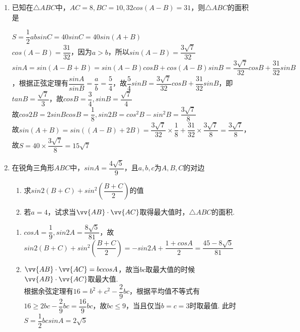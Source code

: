 \begin{enumerate}
    \item 已知在$\triangle{ABC}$中，$AC = 8, BC = 10, 32cos(A-B) = 31$，则$\triangle{ABC}$的面积是
    \begin{jieda}
        $S = \dfrac{1}{2}absinC = 40sinC = 40sin(A+B)$ \\
        $cos(A-B) = \dfrac{31}{32}$，因为$a > b$，所以$sin(A-B) = \dfrac{3\sqrt{7}}{32}$\\
        $sinA = sin(A-B+B) = sin(A-B) cosB + cos(A-B)sinB = \dfrac{3\sqrt{7}}{32}cosB+\dfrac{31}{32}sinB$，根据正弦定理有$\dfrac{sinA}{sinB} = \dfrac{a}{b} = \dfrac{5}{4}$，故$\dfrac{5}{4}sinB = \dfrac{3\sqrt{7}}{32}cosB+\dfrac{31}{32}sinB$，即$tanB = \dfrac{\sqrt{7}}{3}$，故$cosB = \dfrac{3}{4}, sinB = \dfrac{\sqrt{7}}{4}$ \\
        故$cos2B = 2sinBcosB = \dfrac{1}{8}, sin2B = cos^2B - sin^2B = \dfrac{3\sqrt{7}}{8}$ \\
        故$sin(A+B) = sin((A-B)+2B) = \dfrac{3\sqrt{7}}{32} \times \dfrac{1}{8} + \dfrac{31}{32} \times \dfrac{3\sqrt{7}}{8} = \dfrac{3\sqrt{7}}{8}$，故$S = 40 \times \dfrac{3\sqrt{7}}{8} = 15\sqrt{7}$
    \end{jieda}
    \item 在锐角三角形$ABC$中，$sinA = \dfrac{4\sqrt{5}}{9}$，且$a,b,c$为$A,B,C$的对边
    \begin{enumerate}
        \item 求$sin2(B+C) + sin^2\left(\dfrac{B+C}{2}\right)$的值
        \item 若$a = 4$，试求当$\vv{AB} \cdot \vv{AC}$取得最大值时，$\triangle{ABC}$的面积.
    \end{enumerate}
    \begin{jieda}
        \begin{enumerate}
            \item $cosA = \dfrac{1}{9}, sin2A = \dfrac{8\sqrt{5}}{81}$，故$sin2(B+C) + sin^2\left(\dfrac{B+C}{2}\right) = -sin2A + \dfrac{1+cosA}{2} = \dfrac{45 - 8\sqrt{5}}{81}$
            \item $\vv{AB} \cdot \vv{AC} = bccosA$，故当$bc$取最大值的时候$\vv{AB} \cdot \vv{AC}$取最大值. \\
            根据余弦定理有$16 = b^2 + c^2 - \dfrac{2}{9}bc$，根据平均值不等式有$16 \geq 2bc - \dfrac{2}{9}bc = \dfrac{16}{9}bc$，故$bc \leq 9$，当且仅当$b = c = 3$时取最值. 此时$S = \dfrac{1}{2}bcsinA = 2\sqrt{5}$
        \end{enumerate}
    \end{jieda}
\end{enumerate}
\clearpage

